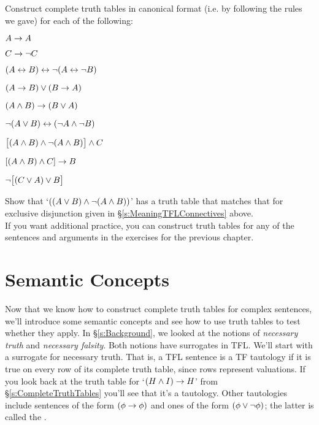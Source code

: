 \practiceproblems
\problempart
Construct complete truth tables in canonical format (i.e. by following the rules we gave) for each of the following:
\begin{earg}
\item $A \rightarrow A$ %
\item $C \rightarrow\neg C$ %
\item $(A \leftrightarrow B) \leftrightarrow \neg(A\leftrightarrow \neg B)$ %
\item $(A \rightarrow B) \vee (B \rightarrow A)$ %
\item $(A \wedge B) \rightarrow (B \vee A)$  %
\item $\neg(A \vee B) \leftrightarrow (\neg A \wedge \neg B)$ %
\item $\bigl[(A\wedge B) \wedge\neg(A\wedge B)\bigr] \wedge C$ %
\item $[(A \wedge B) \wedge C] \rightarrow B$ %
\item $\neg\bigl[(C\vee A) \vee B\bigr]$ %
\end{earg}

\problempart
Show that `$((A \vee B) \wedge \neg(A \wedge B))$' has a truth table that matches that for exclusive disjunction given in \S\ref{s:MeaningTFLConnectives} above.\\

\noindent If you want additional practice, you can construct truth tables for any of the sentences and arguments in the exercises for the previous chapter.


\section{Semantic Concepts}\label{s:semanticconcepts}

Now that we know how to construct complete truth tables for complex sentences, we'll introduce some semantic concepts and see how to use truth tables to test whether they apply.  In \S\ref{s:Background}, we looked at the notions of \emph{necessary truth} and \emph{necessary falsity}. Both notions have surrogates in TFL. We'll start with a surrogate for necessary truth.
That is, a TFL sentence is a TF tautology if it is true on every row of its complete truth table, since rows represent valuations.  If you look back at the truth table for `$(H \wedge I) \rightarrow H$' from \S\ref{s:CompleteTruthTables} you'll see that it's a tautology.  Other tautologies include sentences of the form $(\mathcal{\phi} \rightarrow \mathcal{\phi})$ and ones of the form $(\mathcal{\phi} \vee \neg \mathcal{\phi})$; the latter is called the .

